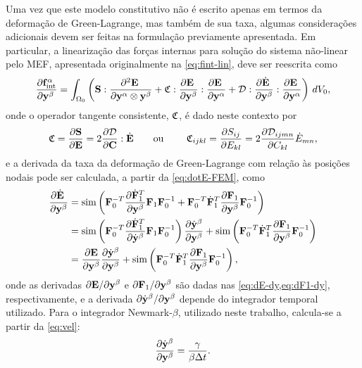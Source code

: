 \documentclass[Tese.tex]{subfiles}
\begin{document}
Uma vez que este modelo constitutivo não é escrito apenas em termos da deformação de Green-Lagrange, mas também de sua taxa, algumas considerações adicionais devem ser feitas na formulação previamente apresentada. Em particular, a linearização das forças internas para solução do sistema não-linear pelo MEF, apresentada originalmente na \cref{eq:fint-lin}, deve ser reescrita como
\begin{equation}\label{eq:fint-lin2}
\dfrac{\partial \mathbf{f}_\text{int}^\alpha}{\partial \mathbf{y}^\beta_{\;\;\;}} = \int_{\Omega_0}\left(\mathbf{S}:\dfrac{\partial^2\mathbf{E}_{\;}}{\partial\mathbf{y}^\alpha\otimes\mathbf{y}^\beta} + \mathfrak{C}:\dfrac{\partial\mathbf{E}_{\;}}{\partial\mathbf{y}^\beta}:\dfrac{\partial\mathbf{E}_{\;}}{\partial\mathbf{y}^\alpha} + \mathcal{D}:\dfrac{\partial\dot{\mathbf{E}}_{\;}}{\partial\mathbf{y}^\beta}:\dfrac{\partial\mathbf{E}_{\;}}{\partial\mathbf{y}^\alpha}\right)\,dV_0,
\end{equation}
onde o operador tangente consistente, $\mathfrak{C}$, é dado neste contexto por
\begin{equation}
\mathfrak{C} = \dfrac{\partial\mathbf{S}}{\partial\mathbf{E}} = 2\dfrac{\partial \mathcal{D}}{\partial\mathbf{C}}:\dot{\mathbf{E}}
\text{\qquad ou \qquad} 
\mathfrak{C}_{ijkl} = \dfrac{\partial{S}_{ij}}{\partial{E}_{kl}} = 2\dfrac{\partial \mathcal{D}_{ijmn}}{\partial C_{kl}}\dot{{E}}_{mn},
\end{equation}
e a derivada da taxa da deformação de Green-Lagrange com relação às posições nodais pode ser calculada, a partir da \cref{eq:dotE-FEM}, como
\begin{equation}
\begin{aligned}
\dfrac{\partial\dot{\mathbf{E}}_{\;}}{\partial\mathbf{y}^\beta} &= \text{sim}\left(\mathbf{F}_0^{-T}\dfrac{\partial\dot{\mathbf{F}}_1^{T}}{\partial\mathbf{y}^\beta}\mathbf{F}_1\mathbf{F}_0^{-1} + \mathbf{F}_0^{-T}\dot{\mathbf{F}}_1^T\dfrac{\partial\mathbf{F}_1}{\partial\mathbf{y}^\beta}\mathbf{F}_0^{-1}\right) \\
&= \text{sim}\left(\mathbf{F}_0^{-T}\dfrac{\partial\dot{\mathbf{F}}_1^{T}}{\partial\dot{\mathbf{y}}^\beta}\mathbf{F}_1\mathbf{F}_0^{-1}\right)\dfrac{\partial\dot{\mathbf{y}}^\beta}{\partial\mathbf{y}^\beta} + \text{sim}\left(\mathbf{F}_0^{-T}\dot{\mathbf{F}}_1^T\dfrac{\partial\mathbf{F}_1}{\partial\mathbf{y}^\beta}\mathbf{F}_0^{-1}\right)\\
&=\dfrac{\partial\mathbf{E}}{\partial\mathbf{y}^\beta}\dfrac{\partial\dot{\mathbf{y}}^\beta}{\partial\mathbf{y}^\beta} + \text{sim}\left(\mathbf{F}_0^{-T}\dot{\mathbf{F}}_1^T\dfrac{\partial\mathbf{F}_1}{\partial\mathbf{y}^\beta}\mathbf{F}_0^{-1}\right),
\end{aligned}
\end{equation}
onde as derivadas ${\partial\mathbf{E}}/{\partial\mathbf{y}^\beta}$ e ${\partial\mathbf{F}_1}/{\partial\mathbf{y}^\beta}$ são dadas nas \cref{eq:dE-dy,eq:dF1-dy}, respectivamente, e a derivada ${\partial\dot{\mathbf{y}}^\beta}/{\partial\mathbf{y}^\beta}$ depende do integrador temporal utilizado. Para o integrador Newmark-$\beta$, utilizado neste trabalho, calcula-se a partir da \cref{eq:vel}:
\begin{equation}
\dfrac{\partial\dot{\mathbf{y}}^\beta}{\partial\mathbf{y}^\beta} = \dfrac{\gamma}{\beta\Delta t}.
\end{equation}
\end{document}
